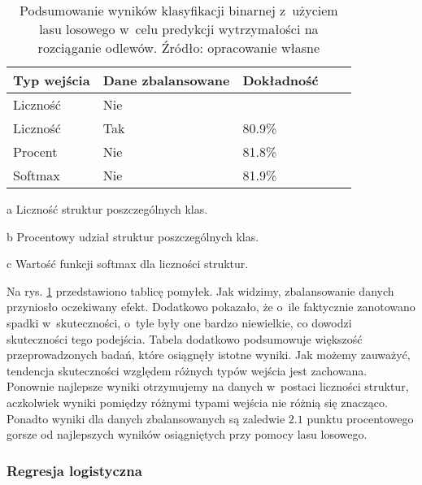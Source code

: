 \begin{table}[!h]
	\centering
	\begin{threeparttable}
		\caption{Podsumowanie wyników klasyfikacji binarnej z~użyciem lasu losowego w~celu predykcji wytrzymałości na rozciąganie odlewów. Źródło: opracowanie własne}
		\label{rfc.binary.summary.table}
		\begin{tabularx}{1\textwidth}{ |X|X|X|X|X| }
		  \hline
		  \textbf{Typ wejścia} & \textbf{Dane zbalansowane} & \textbf{Dokładność}\\

		  \hline
		  Liczność\tnote{a} & Nie  & \bo{83\%} \\

		  \hline
		  Liczność & Tak & 80.9\%\\

		  \hline
  		  Procent\tnote{b} & Nie & 81.8\%\\

	          \hline
  		  Softmax\tnote{c} & Nie & 81.9\%\\

		  \hline
		\end{tabularx}
		\begin{tablenotes}
			\footnotesize
			\item[a] Liczność struktur poszczególnych klas.
			\item[b] Procentowy udział struktur poszczególnych klas.
			\item[c] Wartość funkcji softmax dla liczności struktur.
		\end{tablenotes}
	\end{threeparttable}
\end{table}
Na rys. \ref{rfc.binary.summary.table} przedstawiono tablicę pomyłek. Jak widzimy, zbalansowanie danych przyniosło oczekiwany efekt. Dodatkowo pokazało, że o~ile faktycznie zanotowano spadki w~skuteczności, o~tyle były one bardzo niewielkie, co dowodzi skuteczności tego podejścia. 
Tabela dodatkowo podsumowuje większość przeprowadzonych badań, które osiągnęły istotne wyniki.
Jak możemy zauważyć, tendencja skuteczności względem różnych typów wejścia jest zachowana. Ponownie najlepsze wyniki otrzymujemy na danych w~postaci liczności struktur, aczkolwiek wyniki pomiędzy różnymi typami wejścia nie różnią się znacząco. Ponadto wyniki dla danych zbalansowanych są zaledwie $2.1$ punktu procentowego gorsze od najlepszych wyników osiągniętych przy pomocy lasu losowego. 

\subsubsection{Regresja logistyczna}
\label{structures.with.logit}

